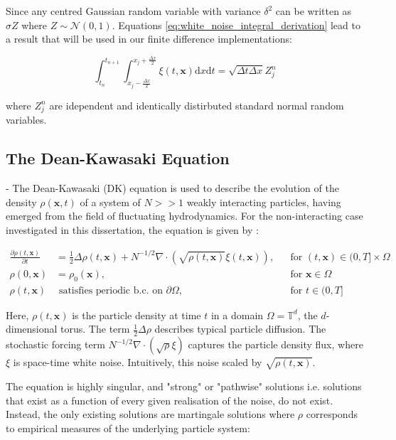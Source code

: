 Since any centred Gaussian random variable with variance $\delta^2$ can be written as $\sigma Z$ where 
$Z \sim \mathcal{N}(0,1)$. Equations \eqref{eq:white_noise_integral_derivation}
lead to a result that will be used in our finite difference 
implementations:

\begin{equation}\label{eq:white_noise_result}
    \int_{t_n}^{t_{n+1}} \int_{x_j - \frac{\Delta x}{2}}^{x_j + \frac{\Delta x}{2}} \xi(t, \mathbf{x})
    \mathrm{d}x \mathrm{d}t = \sqrt{\Delta t \Delta x} Z_j^n
\end{equation}

where $Z_j^n$ are idependent and identically distirbuted standard normal random variables.

\subsection{The Dean-Kawasaki Equation}
-
The Dean-Kawasaki (DK) equation is used to describe the evolution of the density 
$\rho(\mathbf{x}, t)$ of a system of $N >> 1$ weakly interacting particles, 
having emerged from the field of fluctuating hydrodynamics.
For the non-interacting case investigated in this dissertation, the equation is given by
\cite{cornalba2025multilevel}:

\begin{align}\label{eq:dk_spde_2}
\frac{\partial \rho(t, \mathbf{x})}{\partial t} &=
\frac{1}{2}\Delta\rho(t, \mathbf{x}) + N^{-1/2}\nabla\cdot(\sqrt{\rho(t, \mathbf{x})}\xi(t, \mathbf{x})), 
&& \text{for } (t, \mathbf{x}) \in (0, T] \times \Omega \tag{DK} \\
\rho(0, \mathbf{x}) &= \rho_0(\mathbf{x}), && \text{for } \mathbf{x} \in \Omega \nonumber \\
\rho(t, \mathbf{x}) &\text{ satisfies periodic b.c. on } \partial \Omega, && \text{for } t \in (0, T] \nonumber
\end{align}

Here, $\rho(t, \mathbf{x})$ is the particle density at time $t$ in a 
domain $\Omega = \mathbb{T}^d$, the $d$-dimensional torus. 
The term $\frac{1}{2} \Delta \rho$ describes
typical particle diffusion. The stochastic forcing term $N^{-1/2}
\nabla \cdot (\sqrt{\rho}\xi)$ captures the particle density flux,
where $\xi$ is space-time white noise. Intuitively, this noise scaled
by $\sqrt{\rho(t, \mathbf{x})}$.


The equation is highly singular, and "strong" or "pathwise" solutions 
i.e. solutions that exist as a function of every given realisation 
of the noise, do not exist. Instead, the only existing solutions are martingale 
solutions where $\rho$ corresponds to empirical measures of the underlying 
particle system:

